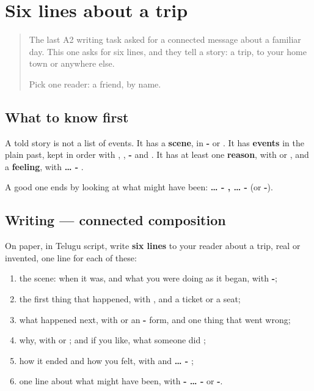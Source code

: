 \section[(six lines)]{Six lines about a trip}

\label{lesson:TE-W325-six-lines}



\begin{quote}
The last A2 writing task asked for a connected message about a familiar day. This one asks for six lines, and they tell a story: a trip, to your home town or anywhere else.

Pick one reader: a friend, by name.
\end{quote}

\subsection*{What to know first}
A told story is not a list of events. It has a \textbf{scene}, in \textbf{-} or \textbf{}. It has \textbf{events} in the plain past, kept in order with \textbf{}, \textbf{ }, \textbf{-} and \textbf{}. It has at least one \textbf{reason}, with \textbf{} or \textbf{}, and a \textbf{feeling}, with \textbf{ … - }.

A good one ends by looking at what might have been: \textbf{… - , … -} (or \textbf{-}).

\subsection*{Writing — connected composition}
On paper, in Telugu script, write \textbf{six lines} to your reader about a trip, real or invented, one line for each of these:

\begin{enumerate}
\raggedright
  \item the scene: when it was, and what you were doing as it began, with \textbf{-};
  \item the first thing that happened, with \textbf{}, and a ticket or a seat;
  \item what happened next, with \textbf{ } or an \textbf{-} form, and one thing that went wrong;
  \item why, with \textbf{} or \textbf{}; and if you like, what someone did \textbf{};
  \item how it ended and how you felt, with \textbf{} and \textbf{ … - };
  \item one line about what might have been, with \textbf{-  … -} or \textbf{-}.
\end{enumerate}


